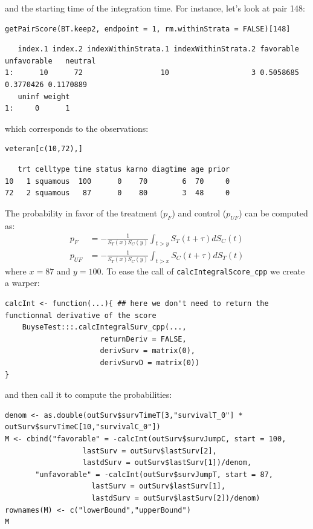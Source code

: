 \documentclass[12pt]{article}
\begin{document}
and the starting time of the integration time. For instance, let's
look at pair 148:
\lstset{language=r,label= ,caption= ,captionpos=b,numbers=none}
\begin{lstlisting}
getPairScore(BT.keep2, endpoint = 1, rm.withinStrata = FALSE)[148]
\end{lstlisting}

\begin{verbatim}
   index.1 index.2 indexWithinStrata.1 indexWithinStrata.2 favorable unfavorable   neutral
1:      10      72                  10                   3 0.5058685   0.3770426 0.1170889
   uninf weight
1:     0      1
\end{verbatim}


which corresponds to the observations:
\lstset{language=r,label= ,caption= ,captionpos=b,numbers=none}
\begin{lstlisting}
veteran[c(10,72),]
\end{lstlisting}

\begin{verbatim}
   trt celltype time status karno diagtime age prior
10   1 squamous  100      0    70        6  70     0
72   2 squamous   87      0    80        3  48     0
\end{verbatim}


The probability in favor of the treatment (\(p_F\)) and control (\(p_{UF}\)) can be computed
as:
\begin{align*}
p_F &= -\frac{1}{S_T(x)S_C(y)}\int_{t>y} S_T(t+\tau) dS_C(t) \\
p_{UF} &= -\frac{1}{S_T(x)S_C(y)}\int_{t>x} S_C(t+\tau) dS_T(t)
\end{align*}
where \(x=87\) and \(y=100\). To ease the call of \texttt{calcIntegralScore\_cpp} we create a warper:
\lstset{language=r,label= ,caption= ,captionpos=b,numbers=none}
\begin{lstlisting}
calcInt <- function(...){ ## here we don't need to return the functionnal derivative of the score 
    BuyseTest:::.calcIntegralSurv_cpp(..., 
				      returnDeriv = FALSE, 
				      derivSurv = matrix(0), 
				      derivSurvD = matrix(0))
}
\end{lstlisting}

and then call it to compute the probabilities:
\lstset{language=r,label= ,caption= ,captionpos=b,numbers=none}
\begin{lstlisting}
denom <- as.double(outSurv$survTimeT[3,"survivalT_0"] * outSurv$survTimeC[10,"survivalC_0"])
M <- cbind("favorable" = -calcInt(outSurv$survJumpC, start = 100, 
				  lastSurv = outSurv$lastSurv[2],
				  lastdSurv = outSurv$lastSurv[1])/denom,
	   "unfavorable" = -calcInt(outSurv$survJumpT, start = 87, 
				    lastSurv = outSurv$lastSurv[1],
				    lastdSurv = outSurv$lastSurv[2])/denom)
rownames(M) <- c("lowerBound","upperBound")
M
\end{lstlisting}
\end{document}

